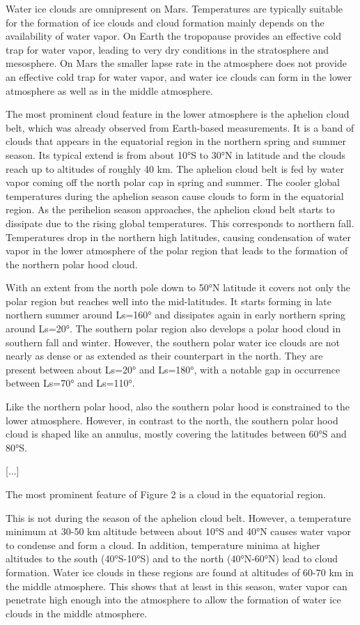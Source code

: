 \documentclass[a4paper,10pt,openany,oneside]{memoir}
\begin{document}
Water ice clouds are omnipresent on Mars. Temperatures are typically suitable for the formation of ice clouds and cloud formation mainly depends on the availability of water vapor. On Earth the tropopause provides an effective cold trap for water vapor, leading to very dry conditions in the stratosphere and mesosphere. On Mars the smaller lapse rate in the atmosphere does not provide an effective cold trap for water vapor, and water ice clouds can form in the lower atmosphere as well as in the middle atmosphere. 

The most prominent cloud feature in the lower atmosphere is the aphelion cloud belt, which was already observed from Earth-based measurements. It is a band of clouds that appears in the equatorial region in the northern spring and summer season. Its typical extend is from about 10°S to 30°N in latitude and the clouds reach up to altitudes of roughly 40 km. The aphelion cloud belt is fed by water vapor coming off the north polar cap in spring and summer. The cooler global temperatures during the aphelion season cause clouds to form in the equatorial region. As the perihelion season approaches, the aphelion cloud belt starts to dissipate due to the rising global temperatures. This corresponds to northern fall. Temperatures drop in the northern high latitudes, causing condensation of water vapor in the lower atmosphere of the polar region that leads to the formation of the northern polar hood cloud. 

With an extent from the north pole down to 50°N latitude it covers not only the polar region but reaches well into the mid-latitudes. It starts forming in late northern summer around Ls=160° and dissipates again in early northern spring around Ls=20°. The southern polar region also develops a polar hood cloud in southern fall and winter. However, the southern polar water ice clouds are not nearly as dense or as extended as their counterpart in the north. They are present between about Ls=20° and Ls=180°, with a notable gap in occurrence between Ls=70° and Ls=110°. 

Like the northern polar hood, also the southern polar hood is constrained to the lower atmosphere. However, in contrast to the north, the southern polar hood cloud is shaped like an annulus, mostly covering the latitudes between 60°S and 80°S.

[...]

The most prominent feature of Figure 2 is a cloud in the equatorial region.

This is not during the season of the aphelion cloud belt. However, a temperature minimum at 30-50 km altitude between about 10°S and 40°N causes water vapor to condense and form a cloud. In addition, temperature minima at higher altitudes to the south (40°S-10°S) and to the north (40°N-60°N) lead to cloud formation. Water ice clouds in these regions are found at altitudes of 60-70 km in the middle atmosphere. This shows that at least in this season, water vapor can penetrate high enough into the atmosphere to allow the formation of water ice clouds in the middle atmosphere.
\end{document}

